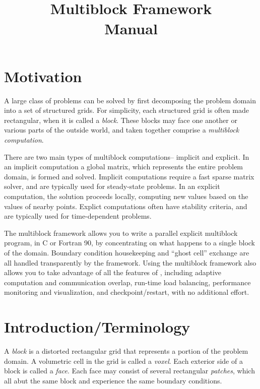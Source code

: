 \documentclass[10pt]{article}
\title{\charmpp\\ Multiblock Framework\\ Manual}
\begin{document}
\maketitle

\section{Motivation}
A large class of problems can be solved by first decomposing the
problem domain into a set of structured grids.  For simplicity,
each structured grid is often made rectangular, when it is called a {\em block}.
These blocks may face one another or various parts of the outside world,
and taken together comprise a {\em multiblock computation}.

There are two main types of multiblock computations-- implicit and explicit.
In an implicit computation a global matrix, which represents the entire
problem domain, is formed and solved.  Implicit computations require
a fast sparse matrix solver, and are typically used for steady-state
problems.  In an explicit computation, the solution proceeds locally,
computing new values based on the values of nearby points. Explict
computations often have stability criteria, and are typically used for
time-dependent problems.

The \charmpp{} multiblock framework allows you to write a parallel 
explicit multiblock program,
in C or Fortran 90, by concentrating on what happens to a single block
of the domain.  Boundary condition housekeeping and ``ghost cell'' exchange
are all handled transparently by the framework.
Using the multiblock framework also allows you to take advantage of all the
features of \charmpp, including adaptive computation and communication 
overlap, run-time load balancing,  performance
monitoring and visualization, and checkpoint/restart, with no additional
effort.


\section{Introduction/Terminology}
A {\em block} is a distorted rectangular grid that represents a 
portion of the problem domain.  A volumetric cell in the grid
is called a {\em voxel}.  Each exterior side of a block
is called a {\em face}. Each face may consist of several 
rectangular {\em patches}, which all abut the same block 
and experience the same boundary conditions.
\end{document}
